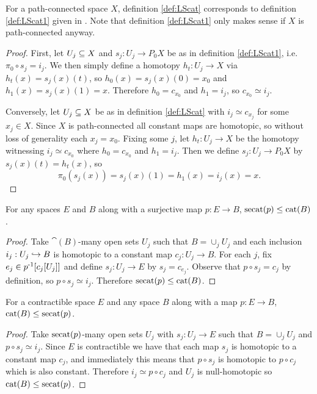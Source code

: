 \begin{remark}
    For a path-connected space $X$, definition \ref{def:LScat} corresponds to definition \ref{def:LScat1} given in \cite{farber2006topology}.
    Note that definition \ref{def:LScat1} only makes sense if $X$ is path-connected anyway.
    \begin{proof}
        First, let $U_j \subseteq X$ and $s_j : U_j \to P_0 X$ be as in definition \ref{def:LScat1}, i.e. $\pi_0 \circ s_j = i_j$.
        We then simply define a homotopy $h_t : U_j \to X$ via $h_t(x) = s_j(x)(t)$, so $h_0(x) = s_j(x)(0) = x_0$ and $h_1(x) = s_j(x)(1) = x$.
        Therefore $h_0 = c_{x_0}$ and $h_1 = i_j$, so $c_{x_0} \simeq i_j$.
        
        Conversely, let $U_j \subseteq X$ be as in definition \ref{def:LScat} with $i_j \simeq c_{x_j}$ for some $x_j \in X$.
        Since $X$ is path-connected all constant maps are homotopic, so without loss of generality each $x_j = x_0$. 
        Fixing some $j$, let $h_t : U_j \to X$ be the homotopy witnessing $i_j \simeq c_{x_0}$ where $h_0 = c_{x_0}$ and $h_1 = i_j$.
        Then we define $s_j : U_j \to P_0 X$ by $s_j(x)(t) = h_t(x)$, so
        \[
            \pi_0 (s_j(x)) = s_j(x)(1) = h_1(x) = i_j(x) = x.
        \]
    \end{proof}
\end{remark}

\begin{proposition}\label{prop:secat-leq-cat}
    For any spaces $E$ and $B$ along with a surjective map $p : E \to B$, $\operatorname{secat}(p) \leq \operatorname{cat}(B)$.
    \begin{proof}
        Take $\cat(B)$-many open sets $U_j$ such that $B = \cup_j U_j$ and each inclusion $i_j : U_j \hookrightarrow B$ is homotopic to a constant map $c_j : U_j \to B$.
        For each $j$, fix $e_j \in p^{\text{-}1}[c_j[U_j]]$ and define $s_j : U_j \to E$ by $s_j = c_{e_j}$.
        Observe that $p \circ s_j = c_j$ by definition, so $p \circ s_j \simeq i_j$.
        Therefore $\operatorname{secat}(p) \leq \operatorname{cat}(B)$.
    \end{proof}
\end{proposition}

\begin{proposition}\label{prop:cat-leq-secat}
    For a contractible space $E$ and any space $B$ along with a map $p : E \to B$, $\operatorname{cat}(B) \leq \operatorname{secat}(p)$.
    \begin{proof}
        Take $\operatorname{secat}(p)$-many open sets $U_j$ with $s_j : U_j \to E$ such that $B = \cup_j U_j$ and $p \circ s_j \simeq i_j$.
        Since $E$ is contractible we have that each map $s_j$ is homotopic to a constant map $c_j$, and immediately this means that $p \circ s_j$ is homotopic to $p \circ c_j$ which is also constant.
        Therefore $i_j \simeq p \circ c_j$ and $U_j$ is null-homotopic so $\operatorname{cat}(B) \leq \operatorname{secat}(p)$.
    \end{proof}
\end{proposition}


